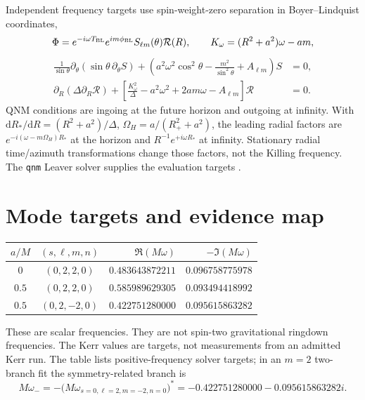 \documentclass[11pt,letterpaper]{article}
\newcommand{\dd}{\mathrm{d}}
\begin{document}
Independent frequency targets use spin-weight-zero separation in Boyer--Lindquist coordinates,
\begin{equation}
 \Phi=e^{-i\omega T_{\rm BL}}e^{im\phi_{\rm BL}}S_{\ell m}(\theta)\mathcal R(R),\qquad
 K_\omega=(R^2+a^2)\omega-am,
\end{equation}
\begin{align}
 \frac1{\sin\theta}\partial_\theta(\sin\theta\,\partial_\theta S)
 +\left(a^2\omega^2\cos^2\theta-\frac{m^2}{\sin^2\theta}+A_{\ell m}\right)S&=0,\\
 \partial_R(\Delta\partial_R\mathcal R)
 +\left[\frac{K_\omega^2}{\Delta}-a^2\omega^2+2am\omega-A_{\ell m}\right]\mathcal R&=0.
\end{align}
QNM conditions are ingoing at the future horizon and outgoing at infinity. With $\dd R_*/\dd R=(R^2+a^2)/\Delta$, $\Omega_H=a/(R_+^2+a^2)$, the leading radial factors are $e^{-i(\omega-m\Omega_H)R_*}$ at the horizon and $R^{-1}e^{+i\omega R_*}$ at infinity. Stationary radial time/azimuth transformations change those factors, not the Killing frequency. The \texttt{qnm} Leaver solver supplies the evaluation targets \cite{qnm}.

\clearpage
\section{Mode targets and evidence map}
\begin{center}\small
\begin{tabular}{@{}ccrr@{}}\toprule
$a/M$ & $(s,\ell,m,n)$ & $\Re(M\omega)$ & $-\Im(M\omega)$ \\\midrule
$0$ & $(0,2,2,0)$ & $0.483643872211$ & $0.096758775978$ \\
$0.5$ & $(0,2,2,0)$ & $0.585989629305$ & $0.093494418992$ \\
$0.5$ & $(0,2,-2,0)$ & $0.422751280000$ & $0.095615863282$ \\\bottomrule
\end{tabular}\end{center}
These are scalar frequencies. They are not spin-two gravitational ringdown frequencies. The Kerr values are targets, not measurements from an admitted Kerr run. The table lists positive-frequency solver targets; in an $m=2$ two-branch fit the symmetry-related branch is
\begin{equation}
 M\omega_-=-\big(M\omega_{s=0,\ell=2,m=-2,n=0}\big)^*
 =-0.422751280000-0.095615863282i.
\end{equation}
\end{document}
